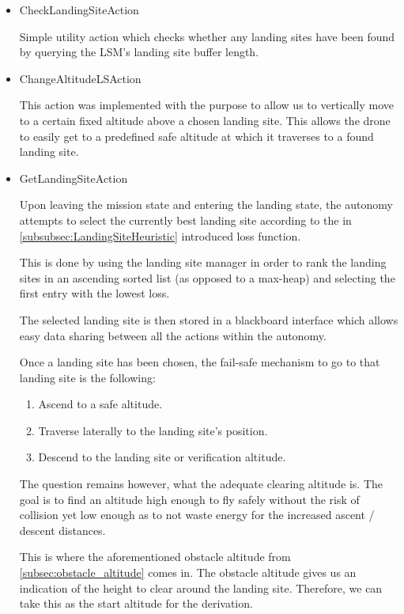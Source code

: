 \begin{itemize}
    \item CheckLandingSiteAction

    Simple utility action which checks whether any landing sites have been found by querying the LSM's landing site buffer length.
    \item ChangeAltitudeLSAction

    This action was implemented with the purpose to allow us to vertically move to a certain fixed altitude above a chosen landing site. This allows the drone to easily get to a predefined safe altitude at which it traverses to a found landing site.
    \item GetLandingSiteAction

    Upon leaving the mission state and entering the landing state, the autonomy attempts to select the currently best landing site according to the in \cref{subsubsec:LandingSiteHeuristic} introduced loss function.

    This is done by using the landing site manager in order to rank the landing sites in an ascending sorted list (as opposed to a max-heap) and selecting the first entry with the lowest loss.

    The selected landing site is then stored in a blackboard interface which allows easy data sharing between all the actions within the autonomy.

    Once a landing site has been chosen, the fail-safe mechanism to go to that landing site is the following:

    \begin{enumerate}
        \item Ascend to a safe altitude.
        \item Traverse laterally to the landing site's position.
        \item Descend to the landing site or verification altitude.
    \end{enumerate}

    The question remains however, what the adequate clearing altitude is. The goal is to find an altitude high enough to fly safely without the risk of collision yet low enough as to not waste energy for the increased ascent / descent distances.

    This is where the aforementioned obstacle altitude from \cref{subsec:obstacle_altitude} comes in. The obstacle altitude gives us an indication of the height to clear around the landing site. Therefore, we can take this as the start altitude for the derivation.


\end{itemize}
